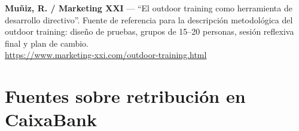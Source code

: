 \begin{enumerate}[label={[\arabic*]}, resume]
  \item \textbf{Muñiz, R. / Marketing XXI} --- ``El outdoor training como herramienta de
        desarrollo directivo''. Fuente de referencia para la descripción metodológica del outdoor
        training: diseño de pruebas, grupos de 15--20 personas, sesión reflexiva final y plan
        de cambio.\\
        \url{https://www.marketing-xxi.com/outdoor-training.html}

\end{enumerate}

\section*{Fuentes sobre retribución en CaixaBank}

